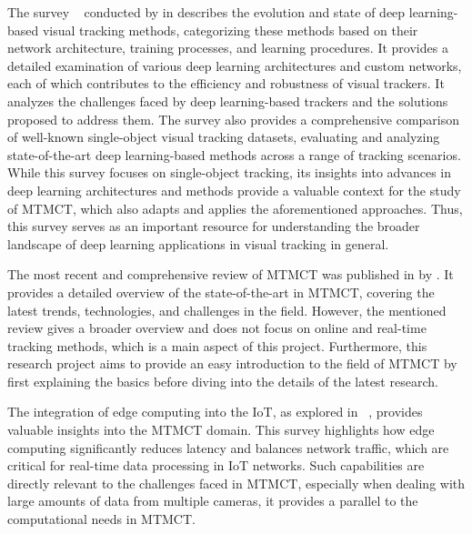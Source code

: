 The survey ~\cite{Zadeh21} conducted by \citeauthor{Zadeh21} in \citeyear{Zadeh21} describes the evolution and state of deep learning-based visual tracking methods, categorizing these methods based on their network architecture, training processes, and learning procedures. It provides a detailed examination of various deep learning architectures and custom networks, each of which contributes to the efficiency and robustness of visual trackers. It analyzes the challenges faced by deep learning-based trackers and the solutions proposed to address them. The survey also provides a comprehensive comparison of well-known single-object visual tracking datasets, evaluating and analyzing state-of-the-art deep learning-based methods across a range of tracking scenarios. While this survey focuses on single-object tracking, its insights into advances in deep learning architectures and methods provide a valuable context for the study of MTMCT, which also adapts and applies the aforementioned approaches. Thus, this survey serves as an important resource for understanding the broader landscape of deep learning applications in visual tracking in general.

The most recent and comprehensive review of MTMCT was published in \citeyear{Amosa23} by \textcite{Amosa23}. It provides a detailed overview of the state-of-the-art in MTMCT, covering the latest trends, technologies, and challenges in the field. However, the mentioned review gives a broader overview and does not focus on online and real-time tracking methods, which is a main aspect of this project. Furthermore, this research project aims to provide an easy introduction to the field of MTMCT by first explaining the basics before diving into the details of the latest research.

The integration of edge computing into the IoT, as explored in ~\cite{Yu17}, provides valuable insights into the MTMCT domain. This survey highlights how edge computing significantly reduces latency and balances network traffic, which are critical for real-time data processing in IoT networks. Such capabilities are directly relevant to the challenges faced in MTMCT, especially when dealing with large amounts of data from multiple cameras, it provides a parallel to the computational needs in MTMCT.